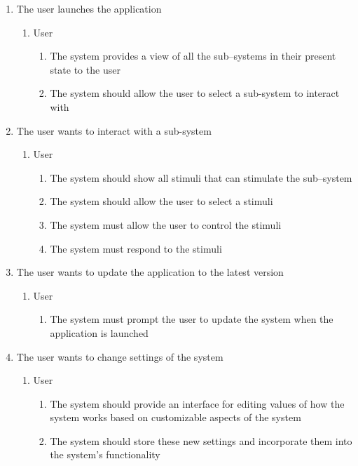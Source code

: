 \documentclass[]{article}
\begin{document}
\begin{enumerate}
	\item The user launches the application
	\begin{enumerate}
		\item User
			\begin{enumerate}
				\item The system provides a view of all the sub--systems in their present state to the user
				\item The system should allow the user to select a sub-system to interact with
			\end{enumerate}
	\end{enumerate}
	\item The user wants to interact with a sub-system
	\begin{enumerate}
		\item User
			\begin{enumerate}
				\item The system should show all stimuli that can stimulate the sub--system
				\item The system should allow the user to select a stimuli
				\item The system must allow the user to control the stimuli
				\item The system must respond to the stimuli
			\end{enumerate}
	\end{enumerate}
	\item The user wants to update the application to the latest version
	\begin{enumerate}
		\item User
			\begin{enumerate}
				\item The system must prompt the user to update the system when the application is launched
			\end{enumerate}
	\end{enumerate}
	\item The user wants to change settings of the system
	\begin{enumerate}
		\item User
			\begin{enumerate}
				\item The system should provide an interface for editing values of how the system works based on customizable aspects of the system
				\item The system should store these new settings and incorporate them into the system’s functionality

\end{enumerate}
\end{enumerate}
\end{enumerate}
\end{document}
